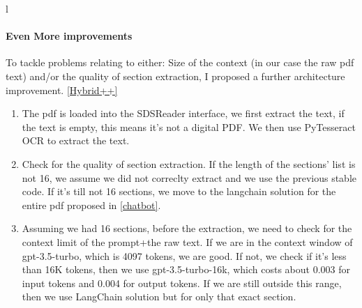 l\documentclass[a4paper,12pt,twoside]{report}
\begin{document}
\paragraph{Even More improvements}
To tackle problems relating to either: Size of the context (in our case the raw pdf text) and/or the quality of section extraction, I proposed a further architecture improvement. \ref{Hybrid++}
\begin{enumerate}
\item The pdf is loaded into the SDSReader interface, we first extract the text, if the text is empty, this means it's not a digital PDF. We then use PyTesseract OCR to extract the text.
\item Check for the quality of section extraction. If the length of the sections' list is not 16, we assume we did not correclty extract and we use the previous stable code. If it's till not 16 sections, we move to the langchain solution for the entire pdf proposed in \ref{chatbot}.
\item Assuming we had 16 sections, before the extraction, we need to check for the context limit of the prompt+the raw text. If we are in the context window of gpt-3.5-turbo, which is 4097 tokens, we are good. If not, we check if it's less than 16K tokens, then we use gpt-3.5-turbo-16k, which costs about 0.003 for input tokens and 0.004 for output tokens. If we are still outside this range, then we use LangChain solution but for only that exact section.
\end{enumerate}
\end{document}
